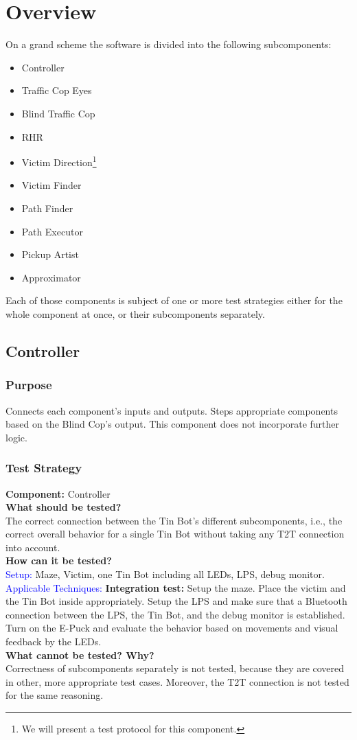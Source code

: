 \documentclass[a4paper,parskip,headheight=38pt]{scrartcl} %
\newcommand{\teststrat}[5]{
    \subsubsection{Test Strategy}
	\textbf{Component:} #1 \\
	\noindent\textbf{What should be tested?} \\
    \noindent #2 \\
	\noindent\textbf{How can it be tested?} \\
    \noindent\textcolor{blue}{Setup:} #3 \\
    \noindent\textcolor{blue}{Applicable Techniques:} #4 \\
	\noindent\textbf{What cannot be tested? Why?} \\
    \noindent #5
}
\newcommand{\ie}{i.e.}
\newcommand{\BLACK}{\textbf{Integration test: }}
\begin{document}
\section{Overview}

On a grand scheme the software is divided into the following subcomponents:

\begin{itemize}
	\item Controller
	\item Traffic Cop Eyes
	\item Blind Traffic Cop 
	\item RHR
	\item Victim Direction\footnote{We will present a test protocol
   for this component.}
	\item Victim Finder
	\item Path Finder
	\item Path Executor
	\item Pickup Artist
    \item Approximator
\end{itemize}

Each of those components is subject of one or more test strategies either for
the whole component at once, or their subcomponents separately.
\subsection{Controller}
\subsubsection{Purpose}
	Connects each component's inputs and outputs. Steps appropriate components
    based on the Blind Cop's output. This component does not incorporate further
    logic.
\teststrat{Controller}{
    The correct connection between the Tin Bot's different subcomponents, \ie,
    the correct overall behavior for a single Tin Bot without taking any T2T
    connection into account.
}{
    Maze, Victim, one Tin Bot including all LEDs, LPS, debug monitor.
}{
    \BLACK Setup the maze. Place the victim and the Tin Bot inside
    appropriately. Setup
    the LPS and make sure that a Bluetooth connection between the LPS, the Tin
    Bot, and the debug monitor is established. Turn on the E-Puck and evaluate
    the behavior based on movements and visual feedback by the LEDs.
}{
    Correctness of subcomponents separately is not tested, because they are
    covered in other, more appropriate test cases. Moreover, the T2T connection
    is not tested for the same reasoning.
}
%
\end{document}
